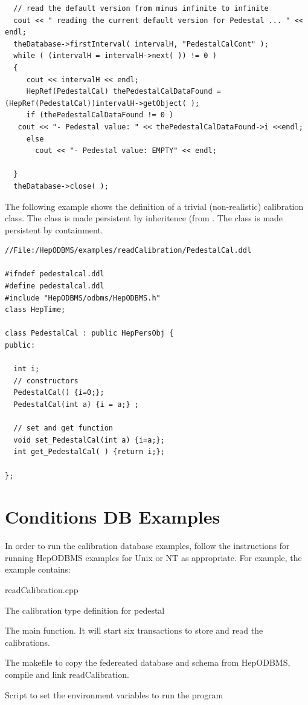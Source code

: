\begin{verbatim}
  // read the default version from minus infinite to infinite 
  cout << " reading the current default version for Pedestal ... " << endl; 
  theDatabase->firstInterval( intervalH, "PedestalCalCont" ); 
  while ( (intervalH = intervalH->next( )) != 0 ) 
  { 
     cout << intervalH << endl; 
     HepRef(PedestalCal) thePedestalCalDataFound = (HepRef(PedestalCal))intervalH->getObject( ); 
     if (thePedestalCalDataFound != 0 ) 
   cout << "- Pedestal value: " << thePedestalCalDataFound->i <<endl; 
     else 
       cout << "- Pedestal value: EMPTY" << endl; 
  
  } 
  theDatabase->close( ); 
\end{verbatim}

\par

The following example shows the definition of a trivial
(non-realistic) calibration class.  The class is made persistent by
inheritence (from . The 
class is made persistent by containment.
\begin{verbatim}
//File:/HepODBMS/examples/readCalibration/PedestalCal.ddl

#ifndef pedestalcal.ddl 
#define pedestalcal.ddl 
#include "HepODBMS/odbms/HepODBMS.h" 
class HepTime; 
  
class PedestalCal : public HepPersObj { 
public: 
  
  int i; 
  // constructors 
  PedestalCal() {i=0;}; 
  PedestalCal(int a) {i = a;} ; 

  // set and get function 
  void set_PedestalCal(int a) {i=a;}; 
  int get_PedestalCal( ) {return i;}; 
  
}; 
\end{verbatim}
\section{Conditions DB Examples}

\par

In order to run the calibration database examples, follow the instructions for running
HepODBMS examples for Unix or NT as appropriate. For example, the 
example contains:\begin{DLtt}{readCalibration.cpp}
\item[Pedestal.ddl]The calibration type definition for pedestal
\item[readCalibration.cpp]The main function. It will start six transactions to store and read the calibrations.
\item[GNUmakefile]The makefile to copy the federeated database and schema from HepODBMS, compile and link readCalibration.
\item[example_setup]Script to set the environment variables to run the program
\end{DLtt}

